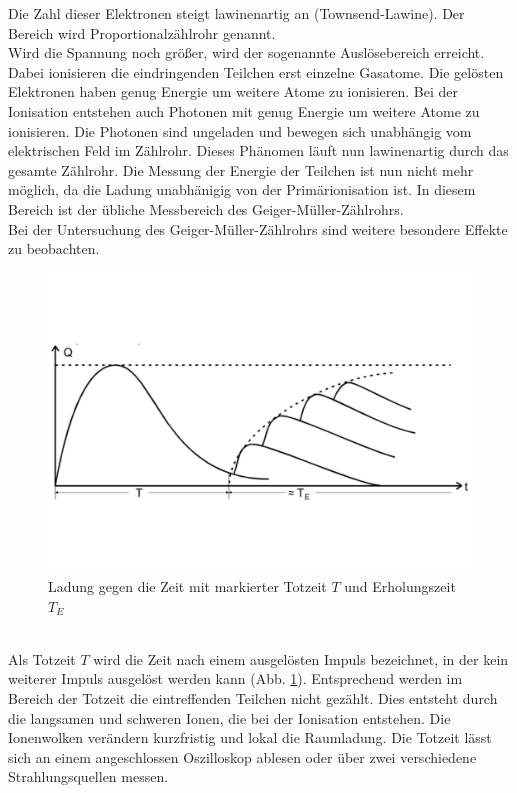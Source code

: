 Die Zahl dieser Elektronen steigt lawinenartig an (Townsend-Lawine).
Der Bereich wird Proportionalzählrohr genannt.
\\Wird die Spannung noch größer, wird der sogenannte Auslösebereich erreicht.
Dabei ionisieren die eindringenden Teilchen erst einzelne Gasatome.
Die gelösten Elektronen haben genug Energie um weitere Atome zu ionisieren.
Bei der Ionisation entstehen auch Photonen mit genug Energie um weitere Atome zu ionisieren.
Die Photonen sind ungeladen und bewegen sich unabhängig vom elektrischen Feld im Zählrohr.
Dieses Phänomen läuft nun lawinenartig durch das gesamte Zählrohr.
Die Messung der Energie der Teilchen ist nun nicht mehr möglich, da die Ladung unabhänigig von der Primärionisation ist.
In diesem Bereich ist der übliche Messbereich des Geiger-Müller-Zählrohrs.
\\Bei der Untersuchung des Geiger-Müller-Zählrohrs sind weitere besondere Effekte zu beobachten.
\begin{figure}[h!]
  \centering
  \includegraphics[width=\textwidth]{703totzeit.pdf}
  \caption{Ladung gegen die Zeit mit markierter Totzeit $T$ und Erholungszeit $T_{E}$ \cite{1}}
  \label{fig:totzeit}
\end{figure}
\\Als Totzeit $T$ wird die Zeit nach einem ausgelösten Impuls bezeichnet, in der kein weiterer Impuls ausgelöst werden kann (Abb. \ref{fig:totzeit}).
Entsprechend werden im Bereich der Totzeit die eintreffenden Teilchen nicht gezählt.
Dies entsteht durch die langsamen und schweren Ionen, die bei der Ionisation entstehen.
Die Ionenwolken verändern kurzfristig und lokal die Raumladung.
Die Totzeit lässt sich an einem angeschlossen Oszilloskop ablesen oder über zwei verschiedene Strahlungsquellen messen.
